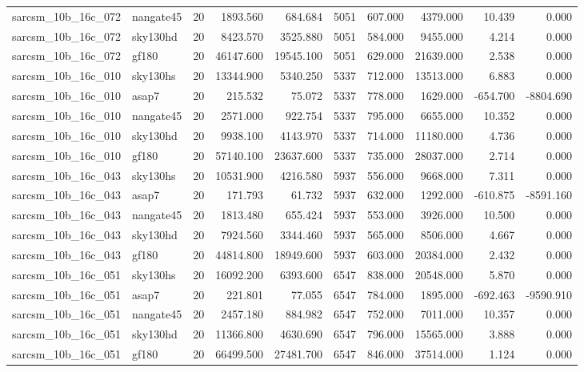 \begin{tabular}{llrrrrrrrr}
sarcsm\_10b\_16c\_072 & nangate45 & 20 & 1893.560 & 684.684 & 5051 & 607.000 & 4379.000 & 10.439 & 0.000 \\
sarcsm\_10b\_16c\_072 & sky130hd & 20 & 8423.570 & 3525.880 & 5051 & 584.000 & 9455.000 & 4.214 & 0.000 \\
sarcsm\_10b\_16c\_072 & gf180 & 20 & 46147.600 & 19545.100 & 5051 & 629.000 & 21639.000 & 2.538 & 0.000 \\
sarcsm\_10b\_16c\_010 & sky130hs & 20 & 13344.900 & 5340.250 & 5337 & 712.000 & 13513.000 & 6.883 & 0.000 \\
sarcsm\_10b\_16c\_010 & asap7 & 20 & 215.532 & 75.072 & 5337 & 778.000 & 1629.000 & -654.700 & -8804.690 \\
sarcsm\_10b\_16c\_010 & nangate45 & 20 & 2571.000 & 922.754 & 5337 & 795.000 & 6655.000 & 10.352 & 0.000 \\
sarcsm\_10b\_16c\_010 & sky130hd & 20 & 9938.100 & 4143.970 & 5337 & 714.000 & 11180.000 & 4.736 & 0.000 \\
sarcsm\_10b\_16c\_010 & gf180 & 20 & 57140.100 & 23637.600 & 5337 & 735.000 & 28037.000 & 2.714 & 0.000 \\
sarcsm\_10b\_16c\_043 & sky130hs & 20 & 10531.900 & 4216.580 & 5937 & 556.000 & 9668.000 & 7.311 & 0.000 \\
sarcsm\_10b\_16c\_043 & asap7 & 20 & 171.793 & 61.732 & 5937 & 632.000 & 1292.000 & -610.875 & -8591.160 \\
sarcsm\_10b\_16c\_043 & nangate45 & 20 & 1813.480 & 655.424 & 5937 & 553.000 & 3926.000 & 10.500 & 0.000 \\
sarcsm\_10b\_16c\_043 & sky130hd & 20 & 7924.560 & 3344.460 & 5937 & 565.000 & 8506.000 & 4.667 & 0.000 \\
sarcsm\_10b\_16c\_043 & gf180 & 20 & 44814.800 & 18949.600 & 5937 & 603.000 & 20384.000 & 2.432 & 0.000 \\
sarcsm\_10b\_16c\_051 & sky130hs & 20 & 16092.200 & 6393.600 & 6547 & 838.000 & 20548.000 & 5.870 & 0.000 \\
sarcsm\_10b\_16c\_051 & asap7 & 20 & 221.801 & 77.055 & 6547 & 784.000 & 1895.000 & -692.463 & -9590.910 \\
sarcsm\_10b\_16c\_051 & nangate45 & 20 & 2457.180 & 884.982 & 6547 & 752.000 & 7011.000 & 10.357 & 0.000 \\
sarcsm\_10b\_16c\_051 & sky130hd & 20 & 11366.800 & 4630.690 & 6547 & 796.000 & 15565.000 & 3.888 & 0.000 \\
sarcsm\_10b\_16c\_051 & gf180 & 20 & 66499.500 & 27481.700 & 6547 & 846.000 & 37514.000 & 1.124 & 0.000 \\

\end{tabular}
